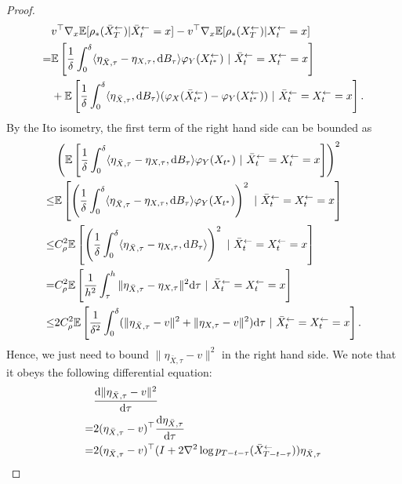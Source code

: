 \begin{proof}
\begin{align}
& v^\top \nabla_x \mathbb{E}[\rho_*(\bar{X}_{T}^\leftarrow) | \bar{X}_{t}^\leftarrow = x] -  v^\top \nabla_x \mathbb{E}[\rho_*({X}_{T}^\leftarrow) | {X}_{t}^\leftarrow = x]  \\
 = &  \mathbb{E}\left[ \frac{1}{\delta} \int_{0}^\delta \langle \eta_{\bar{X},\tau} -\eta_{{X},\tau}, \mathrm{d} B_\tau \rangle  \varphi_Y( {X}_{t^*}^\leftarrow)   ~|~\bar{X}_{t}^\leftarrow = {X}_{t}^\leftarrow = x\right]  \\
 & + \mathbb{E}\left[ \frac{1}{\delta} \int_{0}^\delta \langle \eta_{\bar{X},\tau} , \mathrm{d} B_\tau \rangle  (\varphi_X( \bar{X}_{t^*}^\leftarrow) - \varphi_Y( {X}_{t^*}^\leftarrow))  ~|~ \bar{X}_{t}^\leftarrow = {X}_{t}^\leftarrow = x\right]. 
 \label{eq:BismutBoundFirst}
\end{align}
By the Ito isometry, the first term of the right hand side can be bounded as 
\begin{align}
& \left( \mathbb{E}\left[ \frac{1}{\delta} \int_{0}^\delta \langle \eta_{\bar{X},\tau} -\eta_{{X},\tau} , \mathrm{d} B_\tau \rangle  \varphi_Y( {X}_{t^*})   ~|~\bar{X}_{t}^\leftarrow = {X}_{t}^\leftarrow =x\right]\right)^2 \\
\leq & 
 \mathbb{E}\left[ \left(\frac{1}{\delta} \int_{0}^\delta \langle \eta_{\bar{X},\tau} -\eta_{{X},\tau} , \mathrm{d} B_\tau \rangle  \varphi_Y( {X}_{t^*}) \right)^2  ~|~\bar{X}_{t}^\leftarrow = {X}_{t}^\leftarrow =x\right] \\
\leq & 
C_\rho^2 \mathbb{E}\left[ \left(\frac{1}{\delta} \int_{0}^\delta \langle \eta_{\bar{X},\tau} -\eta_{{X},\tau} , \mathrm{d} B_\tau \rangle  \right)^2  ~|~\bar{X}_{t}^\leftarrow ={X}_{t}^\leftarrow = x\right] \\
= &
C_\rho^2  \mathbb{E}\left[ \frac{1}{h^2} \int_{\tau}^h \| \eta_{\bar{X},\tau} -\eta_{{X},\tau}\|^2 {\textnormal{d}} \tau  ~|~\bar{X}_{t}^\leftarrow ={X}_{t}^\leftarrow = x\right] \\
\leq &
2 C_\rho^2  \mathbb{E}\left[ \frac{1}{\delta^2} \int_{0}^\delta (\| \eta_{\bar{X},\tau} - v\|^2 + \| \eta_{{X},\tau} - v\|^2) {\textnormal{d}} \tau  ~|~\bar{X}_{t}^\leftarrow ={X}_{t}^\leftarrow = x\right].
\end{align}
Hence, we just need to bound $\|\eta_{\bar{X},\tau} - v\|^2$ in the right hand side. 
We note that it obeys the following differential equation:   
\begin{align}
&\frac{\rd \|\eta_{\bar{X},\tau} - v\|^2}{\rd \tau}  \\
= & 2 (\eta_{\bar{X},\tau} - v)^\top \frac{\rd \eta_{\bar{X},\tau}}{\rd \tau} \\
= & 2 (\eta_{\bar{X},\tau} - v)^\top (I + 2 \nabla^2 \log p_{T- t -\tau}(\bar{X}_{T - t -\tau}^\leftarrow)) \eta_{\bar{X},\tau} \\

\end{align}
\end{proof}
